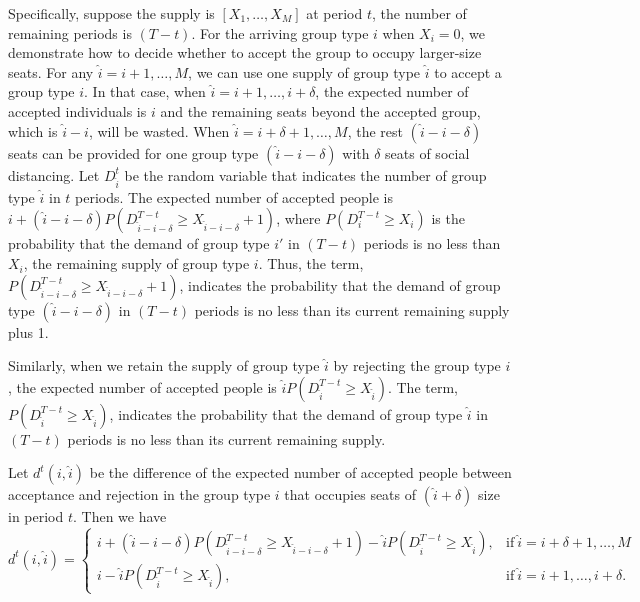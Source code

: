 Specifically, suppose the supply is $[X_1, \ldots, X_M]$ at period $t$, the number of remaining periods is $(T-t)$. For the arriving group type ${i}$ when $X_{i} = 0$, we demonstrate how to decide whether to accept the group to occupy larger-size seats. For any $\hat{i}={i}+1, \ldots, M$, we can use one supply of group type $\hat{i}$ to accept a group type ${i}$. In that case, when $\hat{i} = {i}+1, \ldots, i+\delta$, the expected number of accepted individuals is ${i}$ and the remaining seats beyond the accepted group, which is $\hat{i}-{i}$, will be wasted. When $\hat{i} = {i}+\delta+1, \ldots, M$, the rest $(\hat{i}-{i}-\delta)$ seats can be provided for one group type $(\hat{i}-{i}-\delta)$ with $\delta$ seats of social distancing. Let $D_{\hat{i}}^{t}$ be the random variable that indicates the number of group type $\hat{i}$ in $t$ periods. The expected number of accepted people is ${i} + (\hat{i}-{i}-\delta)P(D_{\hat{i}-{i}-\delta}^{T-t} \geq X_{\hat{i}-{i}-\delta}+1)$, where $P(D_{i}^{T-t} \geq X_{i})$ is the probability that the demand of group type ${i{'}}$ in $(T-t)$ periods is no less than $X_{i}$, the remaining supply of group type ${i}$. Thus, the term, $P(D_{\hat{i}-{i}-\delta}^{T-t} \geq X_{\hat{i}-{i}-\delta}+1)$, indicates the probability that the demand of group type $(\hat{i}-{i}-\delta)$ in $(T-t)$ periods is no less than its current remaining supply plus 1.

Similarly, when we retain the supply of group type $\hat{i}$ by rejecting the group type ${i}$, the expected number of accepted people is $\hat{i} P(D_{\hat{i}}^{T-t} \geq X_{\hat{i}})$. The term, $P(D_{\hat{i}}^{T-t} \geq X_{\hat{i}})$, indicates the probability that the demand of group type $\hat{i}$ in $(T-t)$ periods is no less than its current remaining supply.

Let $d^{t}({i},\hat{i})$ be the difference of the expected number of accepted people between acceptance and rejection in the group type ${i}$ that occupies seats of $(\hat{i}+\delta)$ size in period $t$. Then we have
\begin{equation*}
	d^{t}({i},\hat{i}) = \begin{cases}
    {i} + (\hat{i}-{i}-\delta)P(D_{\hat{i}-{i}-\delta}^{T-t} \geq X_{\hat{i}-{i}-\delta}+1) - \hat{i} P(D_{\hat{i}}^{T-t} \geq X_{\hat{i}}), &\text{if}~ \hat{i} = {i}+\delta+1, \ldots, M \\
    {i} - \hat{i} P(D_{\hat{i}}^{T-t} \geq X_{\hat{i}}), &\text{if}~ \hat{i} = {i}+1, \ldots, {i}+\delta.
		\end{cases}
\end{equation*}

